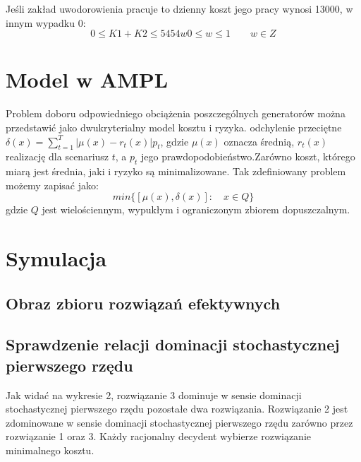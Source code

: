 \documentclass[a4paper,10pt,fleqn]{article}
\begin{document}
		Jeśli zakład uwodorowienia pracuje to dzienny koszt jego pracy wynosi 13000, w innym wypadku 0:
		\begin{subequations}
			\begin{equation}
				0 \leq K1 + K2 \leq 5454w
			\end{equation}
			\begin{equation}
				0 \leq w \leq 1 \qquad w \in Z
			\end{equation}
		\end{subequations}

		

	\section{Model w AMPL}
		Problem doboru odpowiedniego obciążenia poszczególnych generatorów można przedstawić jako dwukryterialny model kosztu i ryzyka. odchylenie przeciętne $\delta(x) = \sum\limits_{t=1}^T |\mu(x)-r_t(x)| p_t$, gdzie $\mu(x)$ oznacza średnią, $r_t(x)$ realizację dla scenariusz $t$, a $p_t$ jego prawdopodobieństwo.Zarówno koszt, którego miarą jest średnia, jaki i ryzyko są minimalizowane. Tak zdefiniowany problem możemy zapisać jako:
		\begin{equation}
			min\{[\mu(x), \delta(x)] : \quad x \in Q\}
		\end{equation}
		gdzie $Q$ jest wielościennym, wypukłym i ograniczonym zbiorem dopuszczalnym.

		
		\section{Symulacja}
			\subsection{Obraz zbioru rozwiązań efektywnych}
				

			\subsection{Sprawdzenie relacji dominacji stochastycznej pierwszego rzędu}
				Jak widać na wykresie 2, rozwiązanie 3 dominuje w sensie dominacji stochastycznej
				pierwszego rzędu pozostałe dwa rozwiązania. Rozwiązanie 2 jest zdominowane
				w sensie dominacji stochastycznej pierwszego rzędu zarówno przez rozwiązanie 1 oraz 3.
				Każdy racjonalny decydent wybierze rozwiązanie minimalnego kosztu.
\end{document}

